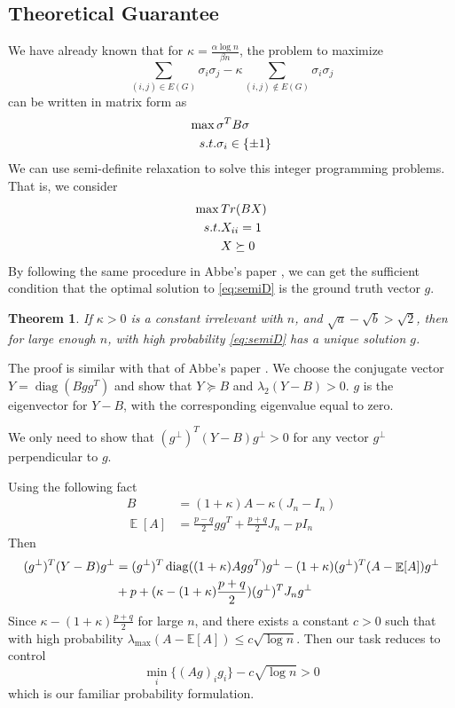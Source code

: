\documentclass{ctexart}
\newtheorem{theorem}{Theorem}
\DeclareMathOperator{\diag}{diag}
\DeclareMathOperator{\E}{\mathbb{E}}
\begin{document}
\subsection{Theoretical Guarantee}
We have already known that for $\kappa = \frac{\alpha \log n}{\beta n}$, the problem to maximize
\begin{equation}
\sum_{(i,j)\in E(G)} \sigma_i \sigma_j - \kappa \sum_{(i,j) \not\in E(G)} \sigma_i \sigma_j
\end{equation}
can be written in matrix form
as 
\begin{align}
\max \, & \sigma^T B \sigma \label{eq:sigmaB}\\
s.t. & \sigma_i \in \{\pm 1\} \notag
\end{align}
We can use semi-definite relaxation to solve this integer programming problems.
That is, we consider
\begin{align}
\max \,& Tr(BX) \label{eq:semiD}\\
s.t. & X_{ii} = 1 \notag \\
&  X \succeq 0 \notag
\end{align}
By following the same procedure in Abbe's paper \cite{abbe2015exact}, we can get the sufficient condition that the optimal solution
to \eqref{eq:semiD} is the ground truth vector $g$.
\begin{theorem}
If $\kappa > 0$ is a constant irrelevant with $n$, and $\sqrt{a} - \sqrt{b} > \sqrt{2}$, then for large enough $n$,
with high probability \eqref{eq:semiD} has a unique solution $g$.
\end{theorem}
The proof is similar with that of Abbe's paper \cite{abbe2015exact}.
We choose the conjugate vector $Y=\diag(Bgg^T)$ and show that 
 $Y \succeq B$ and $\lambda_2(Y-B)>0$.
$g$ is the eigenvector for $Y-B$, with the corresponding eigenvalue equal to zero.

We only need to show that $(g^{\perp})^T (Y-B)g^{\perp} >0$
for any vector $g^{\perp}$ perpendicular to $g$.

Using the following fact
\begin{align}
B &= (1+\kappa) A - \kappa(J_n - I_n) \\
\E[A] &= \frac{p-q}{2}gg^T + \frac{p+q}{2}J_n - pI_n
\end{align}
Then
\begin{align}
	(g^{\perp})^T(Y-B)g^{\perp} &= 
	(g^{\perp})^T\diag((1+\kappa)Agg^T) g^{\perp} 
	-(1+\kappa)(g^{\perp})^T(A-\E[A])g^{\perp}\notag\\
	&+p +(\kappa -(1+\kappa)\frac{p+q}{2})(g^{\perp})^TJ_ng^{\perp}
\end{align}
Since $\kappa -(1+\kappa)\frac{p+q}{2}$ for large $n$,
and there exists a constant $c>0$ such that with high
probability $\lambda_{\max}(A-\mathbb{E}[A]) \leq c\sqrt{\log n}$.
Then our task reduces to control
\begin{equation*}
	\min_{i} \{(Ag)_i g_i\} - c \sqrt{\log n} > 0
\end{equation*}
which is our familiar probability formulation.
\end{document}
